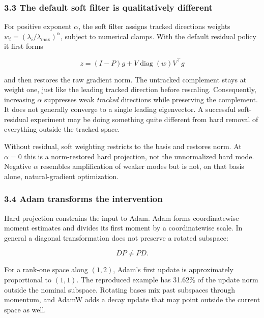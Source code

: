 \documentclass[
  british,
  10pt,
  a4paper,
]{article}
\begin{document}
\subsubsection{3.3 The default soft filter is qualitatively
different}\label{synthesis--the-default-soft-filter-is-qualitatively-different}

For positive exponent \(\alpha\), the soft filter assigns tracked
directions weights \(w_i=(\lambda_i/\lambda_{\max})^\alpha\), subject to
numerical clamps. With the default residual policy it first forms

\[
z=(I-P)g+V\operatorname{diag}(w)V^\top g
\]

and then restores the raw gradient norm. The untracked complement stays
at weight one, just like the leading tracked direction before rescaling.
Consequently\allowbreak{},\allowbreak{} increasing \(\alpha\) suppresses
weak \emph{tracked} directions while preserving the
complement.\allowbreak{} It does not generally converge to a single
leading eigenvector.\allowbreak{} A successful
soft-\allowbreak{}residual experiment may be doing something quite
different from hard removal of everything outside the tracked space.

Without residual, soft weighting restricts to the basis and restores
norm. At \(\alpha=0\) this is a norm-\allowbreak{}restored hard
projection,\allowbreak{} not the unnormalized hard mode. Negative
\(\alpha\) resembles amplification of weaker modes but is not, on that
basis alone, natural-\allowbreak{}gradient
optimization\allowbreak{}.\allowbreak{}

\subsubsection{3.4 Adam transforms the
intervention}\label{synthesis--adam-transforms-the-intervention}

Hard projection constrains the input to Adam. Adam forms coordinatewise
moment estimates and divides its first moment by a coordinatewise scale.
In general a diagonal transformation does not preserve a rotated
subspace:

\[
DP\neq PD.
\]

For a rank-one space along \((1,2)\), Adam's first update is
approximately proportional to \((1,1)\). The reproduced example has
31.62\% of the update norm outside the nominal subspace. Rotating bases
mix past subspaces through momentum, and AdamW adds a decay update that
may point outside the current space as well.
\end{document}
